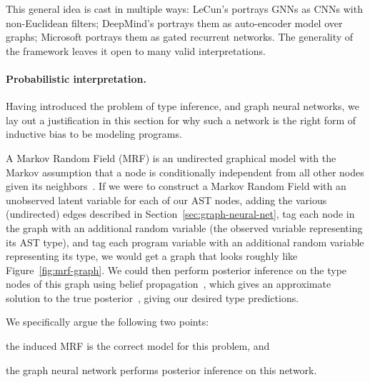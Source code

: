 This general idea is cast in multiple ways: LeCun's portrays GNNs as CNNs with non-Euclidean filters; DeepMind's portrays them as auto-encoder model over graphs; Microsoft portrays them as gated recurrent networks.
The generality of the framework leaves it open to many valid interpretations.


\paragraph{Probabilistic interpretation.}
Having introduced the problem of type inference, and graph neural networks, we lay out a justification in this section for why such a network is the right form of inductive bias to be modeling programs.

A Markov Random Field (MRF) is an undirected graphical model with the Markov assumption that a node is conditionally independent from all other nodes given its neighbors~\cite{kinderman80markov}.
If we were to construct a Markov Random Field with an unobserved latent variable for each of our AST nodes, adding the various (undirected) edges described in Section~\ref{sec:graph-neural-net}, tag each node in the graph with an additional random variable (the observed variable representing its AST type), and tag each program variable with an additional random variable representing its type, we would get a graph that looks roughly like Figure~\ref{fig:mrf-graph}.
We could then perform posterior inference on the type nodes of this graph using belief propagation~\cite{pearl2009causality}, which gives an approximate solution to the true posterior~\cite{weiss2000correctness}, giving our desired type predictions.

We specifically argue the following two points:
\begin{enumerate*}[label=(\roman*)]
	\item the induced MRF is the correct model for this problem, and
	\item the graph neural network performs posterior inference on this network.
\end{enumerate*}

